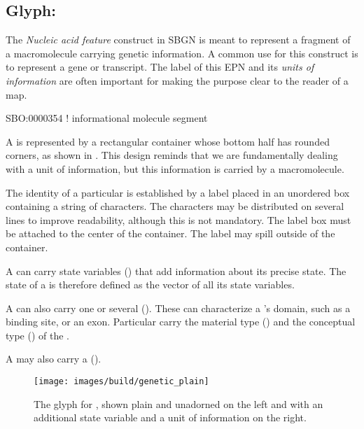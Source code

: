 \subsection{Glyph: }
\label{sec:genetic}

The \emph{Nucleic acid feature} construct in SBGN is meant to represent a fragment of a macromolecule carrying genetic information.  A common use for this construct is to represent a gene or transcript.  The label of this EPN and its \emph{units of information} are often important for making the purpose clear to the reader of a map.

\begin{glyphDescription}

\glyphSboTerm SBO:0000354 !  informational molecule segment

\glyphContainer A  is represented by a rectangular container whose bottom half has rounded corners, as shown in . This design reminds that we are fundamentally dealing with a unit of information, but this information is carried by a macromolecule.

\glyphLabel The identity of a particular  is established by a label placed in an unordered box containing a string of characters.  The characters may be distributed on several lines to improve readability, although this is not mandatory.  The label box must be attached to the center of the container.  The label may spill outside of the container.

\glyphAux A  can carry state variables () that add information about its precise state.  The state of a  is therefore defined as the vector of all its state variables. 

A  can also carry one or several  ().  These can characterize a 's domain, such as a binding site, or an exon.  Particular  carry the material type () and the conceptual type () of the . 

A  may also carry a 
().

\end{glyphDescription}

\begin{figure}[H]
  \centering
  \texttt{[image: images/build/genetic\_plain]} \hspace*{2em.pdf}
  \caption{The \PD glyph for , shown plain and
    unadorned on the left and with an additional state variable and a
    unit of information on the right.} 
  \label{fig:genetic}
\end{figure}
